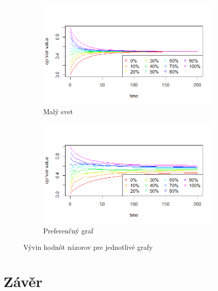 \documentclass[10pt,a4paper]{report}
\begin{document}
\begin{figure}
  \begin{subfigure}[b]{0.475\textwidth}   
      \centering 
      \includegraphics[width=\textwidth]{plots/max-values/small-world-MaxV.png}
      \caption[]%
      {{\small Malý svet}}    
      \label{fig:mean and std of net34}
  \end{subfigure}
  \quad
  \begin{subfigure}[b]{0.475\textwidth}   
      \centering 
      \includegraphics[width=\textwidth]{plots/max-values/prefferentialMaxV.png}
      \caption[]%
      {{\small Preferenčný graf}}    
      \label{fig:mean and std of net44}
  \end{subfigure}
  \caption[ Vývin zmien pre jednotlivé grafy ]
  {\small Vývin hodnôt názorov pre jednotlivé grafy}
  \label{fig:mean and std of nets}
\end{figure}
 
\chapter{Závěr}
\end{document}

